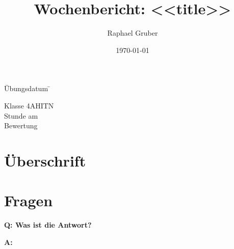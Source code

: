 \documentclass[a4paper, ngerman]{article}
\author{Raphael Gruber}
\title{Wochenbericht: <<title>>}
\date{\origdate\today}
\newenvironment{qanda}{\setlength{\parindent}{0pt}}{\bigskip}
\newcommand{\Qu}{\bigskip\bfseries Q: }
\newcommand{\An}{\par\textbf{A:} \normalfont}
\begin{document}
\begin{titlingpage}

	\maketitle

	\vfill

	\vspace{-100pt}

	\begin{center}

		\begin{tabbing}

			Übungsdatum \quad \= \kill

			Klasse \> 4AHITN \\

			Stunde am \>  \\[20pt]

			Bewertung \>

		\end{tabbing}

	\end{center}

\end{titlingpage}



\tableofcontents

\newpage

\section{Überschrift}

\section{Fragen}

\begin{qanda}
	\Qu Was ist die Antwort?
	\An 42
\end{qanda}
\end{document}
